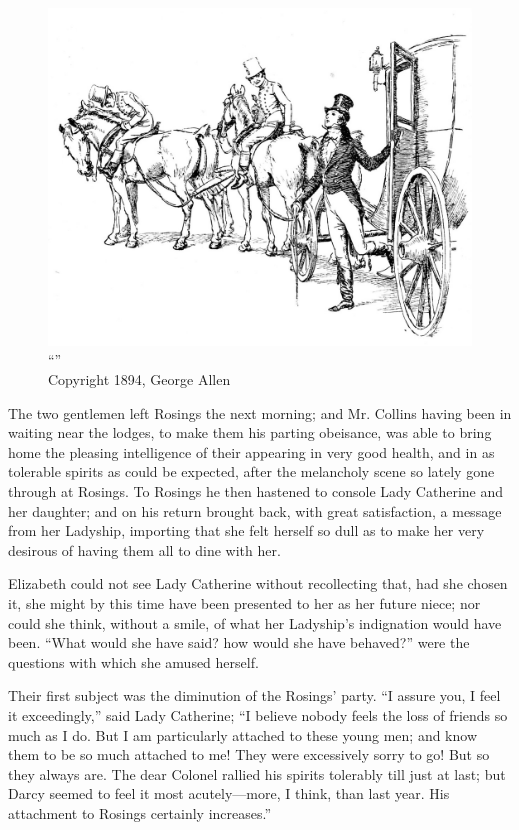 \begin{figure}[htbp]
    \centering
    \includegraphics[width=\textwidth]{illustrations/i_031.jpg}
    \caption{“”\\ Copyright 1894, George Allen}
    \label{fig:image}
\end{figure}


The two gentlemen left Rosings the next morning; and Mr. Collins having been in waiting near the lodges, to make them his parting obeisance, was able to bring home the pleasing intelligence of their appearing in very good health, and in as tolerable spirits as could be expected, after the melancholy scene so lately gone through at Rosings. To Rosings he then hastened to console Lady Catherine and her daughter; and on his return brought back, with great satisfaction, a message from her Ladyship, importing that she felt herself so dull as to make her very desirous of having them all to dine with her.

Elizabeth could not see Lady Catherine without recollecting that, had she chosen it, she might by this time have been presented to her as her future niece; nor could she think, without a smile, of what her Ladyship's indignation would have been. ``What would she have said? how would she have behaved?'' were the questions with which she amused herself.

Their first subject was the diminution of the Rosings' party. ``I assure you, I feel it exceedingly,'' said Lady Catherine; ``I believe nobody feels the loss of friends so much as I do. But I am particularly attached to these young men; and know them to be so much attached to me! They were excessively sorry to go! But so they always are. The dear Colonel rallied his spirits tolerably till just at last; but Darcy seemed to feel it most acutely---more, I think, than last year. His attachment to Rosings certainly increases.''

